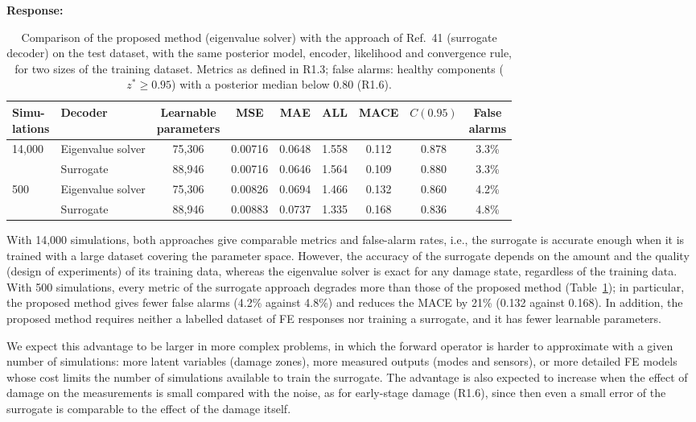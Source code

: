 \documentclass[11pt]{article}
\newenvironment{response}{\par\smallskip\noindent\color{resp}\textbf{Response:}\ }{\par}
\begin{document}
\begin{response}
	\begin{table}[H]
		\centering\small
		\caption{Comparison of the proposed method (eigenvalue solver) with the approach of Ref.~41 (surrogate decoder) on the
			test dataset, with the same posterior model, encoder, likelihood and convergence rule, for two sizes of the
			training dataset. Metrics as defined in R1.3; false alarms: healthy components ($z^*\ge0.95$) with a posterior median below 0.80 (R1.6).}
		\label{tab:surrogate}
		\footnotesize
		\setlength{\tabcolsep}{4pt}
		\begin{tabular}{llccccccc}
			\toprule
			\shortstack{Simu-\\lations} & Decoder & \shortstack{Learnable\\parameters} & MSE & MAE & ALL & MACE & $C(0.95)$ & \shortstack{False\\alarms} \\
			\midrule
			14,000 & Eigenvalue solver & 75,306 & 0.00716 & 0.0648 & 1.558 & 0.112 & 0.878 & 3.3\% \\
				   & Surrogate         & 88,946 & 0.00716 & 0.0646 & 1.564 & 0.109 & 0.880 & 3.3\% \\
			\midrule
			500    & Eigenvalue solver & 75,306 & 0.00826 & 0.0694 & 1.466 & 0.132 & 0.860 & 4.2\% \\
				   & Surrogate         & 88,946 & 0.00883 & 0.0737 & 1.335 & 0.168 & 0.836 & 4.8\% \\
			\bottomrule
		\end{tabular}
	\end{table}

	With 14,000 simulations, both approaches give comparable metrics and false-alarm rates, i.e., the surrogate is accurate enough when it is trained with a large dataset covering the parameter space. However, the accuracy of the surrogate depends on the amount and the quality (design of experiments) of its training data, whereas the eigenvalue solver is exact for any damage state, regardless of the training data. With 500 simulations, every metric of the surrogate approach degrades more than those of the proposed method (Table~\ref{tab:surrogate}); in particular, the proposed method gives fewer false alarms (4.2\% against 4.8\%) and reduces the MACE by 21\% (0.132 against 0.168). In addition, the proposed method requires neither a labelled dataset of FE responses nor training a surrogate, and it has fewer learnable parameters.

	We expect this advantage to be larger in more complex problems, in which the forward operator is harder to approximate with a given number of simulations: more latent variables (damage zones), more measured outputs (modes and sensors), or more detailed FE models whose cost limits the number of simulations available to train the surrogate. The advantage is also expected to increase when the effect of damage on the measurements is small compared with the noise, as for early-stage damage (R1.6), since then even a small error of the surrogate is comparable to the effect of the damage itself.



\end{response}
\end{document}
